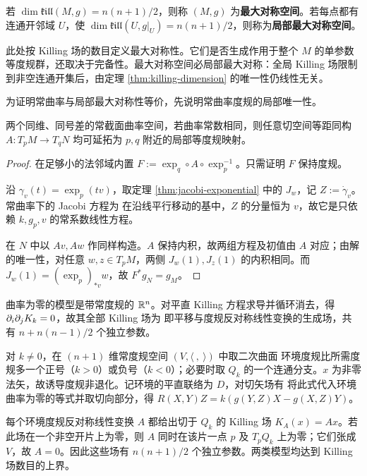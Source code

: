 \begin{definition}
    若 $\dim\mathfrak{kill}(M,g)=n(n+1)/2$，则称 $(M,g)$ 为\textbf{最大对称空间}。若每点都有连通开邻域 $U$，使 $\dim\mathfrak{kill}(U,g|_U)=n(n+1)/2$，则称为\textbf{局部最大对称空间}。
\end{definition}

\begin{remark}
    此处按 Killing 场的数目定义最大对称性。它们是否生成作用于整个 $M$ 的单参数等度规群，还取决于完备性。最大对称空间必局部最大对称：全局 Killing 场限制到非空连通开集后，由定理 \ref{thm:killing-dimension} 的唯一性仍线性无关。
\end{remark}

为证明常曲率与局部最大对称性等价，先说明常曲率度规的局部唯一性。

\begin{lemma}\label{lem:constant-curvature-local-isometry}
    两个同维、同号差的常截面曲率空间，若曲率常数相同，则任意切空间等距同构 $A:T_pM\to T_qN$ 均可延拓为 $p,q$ 附近的局部等度规映射。
\end{lemma}
\begin{proof}
    在足够小的法邻域内置 $F:=\exp_q\circ A\circ\exp_p^{-1}$。只需证明 $F$ 保持度规。

    沿 $\gamma_v(t)=\exp_p(tv)$，取定理 \ref{thm:jacobi-exponential} 中的 $J_w$，记 $Z:=\dot\gamma_v$。常曲率下的 Jacobi 方程为
    在沿线平行移动的基中，$Z$ 的分量恒为 $v$，故它是只依赖 $k,g_p,v$ 的常系数线性方程。

    在 $N$ 中以 $Av,Aw$ 作同样构造。$A$ 保持内积，故两组方程及初值由 $A$ 对应；由解的唯一性，对任意 $w,z\in T_pM$，两侧 $J_w(1),J_z(1)$ 的内积相同。而 $J_w(1)=(\exp_p)_{*v}w$，故 $F^*g_N=g_M$。
\end{proof}

\begin{example}[常曲率模型]\label{eg:space-form-models}
    曲率为零的模型是带常度规的 $\mathbb{R}^n$。对平直 Killing 方程求导并循环消去，得 $\partial_i\partial_jK_k=0$，故其全部 Killing 场为
    即平移与度规反对称线性变换的生成场，共有 $n+n(n-1)/2$ 个独立参数。

    对 $k\ne0$，在 $(n+1)$ 维常度规空间 $(V,\langle\ ,\ \rangle)$ 中取二次曲面
    环境度规比所需度规多一个正号（$k>0$）或负号（$k<0$）；必要时取 $Q_k$ 的一个连通分支。$x$ 为非零法矢，故诱导度规非退化。记环境的平直联络为 $D$，对切矢场有
    将此式代入环境曲率为零的等式并取切向部分，得 $R(X,Y)Z=k(g(Y,Z)X-g(X,Z)Y)$。

    每个环境度规反对称线性变换 $A$ 都给出切于 $Q_k$ 的 Killing 场 $K_A(x)=Ax$。若此场在一个非空开片上为零，则 $A$ 同时在该片一点 $p$ 及 $T_pQ_k$ 上为零；它们张成 $V$，故 $A=0$。因此这些场有 $n(n+1)/2$ 个独立参数。两类模型均达到 Killing 场数目的上界。
\end{example}

